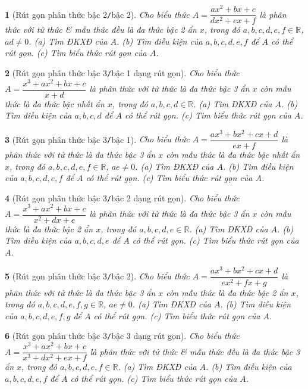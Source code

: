 \documentclass{article}
\newtheorem{baitoan}{}
\begin{document}
\begin{baitoan}[Rút gọn phân thức bậc 2{\tt/}bậc 2]
	Cho biểu thức $A = \dfrac{ax^2 + bx + c}{dx^2 + ex + f}$ là phân thức với tử thức \& mẫu thức đều là đa thức bậc 2 ẩn $x$, trong đó $a,b,c,d,e,f\in\mathbb{R}$, $ad\ne0$. (a) Tìm {\rm ĐKXĐ} của $A$. (b) Tìm điều kiện của $a,b,c,d,e,f$ để $A$ có thể rút gọn. (c) Tìm biểu thức rút gọn của $A$.
\end{baitoan}

\begin{baitoan}[Rút gọn phân thức bậc 3{\tt/}bậc 1 dạng rút gọn]
	Cho biểu thức $A = \dfrac{x^3 + ax^2 + bx + c}{x + d}$ là phân thức với tử thức là đa thức bậc 3 ẩn $x$ còn mẫu thức là đa thức bậc nhất ẩn $x$, trong đó $a,b,c,d\in\mathbb{R}$. (a) Tìm {\rm ĐKXĐ} của $A$. (b) Tìm điều kiện của $a,b,c,d$ để $A$ có thể rút gọn. (c) Tìm biểu thức rút gọn của $A$.
\end{baitoan}

\begin{baitoan}[Rút gọn phân thức bậc 3{\tt/}bậc 1]
	Cho biểu thức $A = \dfrac{ax^3 + bx^2 + cx + d}{ex + f}$ là phân thức với tử thức là đa thức bậc 3 ẩn $x$ còn mẫu thức là đa thức bậc nhất ẩn $x$, trong đó $a,b,c,d,e,f\in\mathbb{R}$, $ae\ne0$. (a) Tìm {\rm ĐKXĐ} của $A$. (b) Tìm điều kiện của $a,b,c,d,e,f$ để $A$ có thể rút gọn. (c) Tìm biểu thức rút gọn của $A$.
\end{baitoan}

\begin{baitoan}[Rút gọn phân thức bậc 3{\tt/}bậc 2 dạng rút gọn]
	Cho biểu thức $A = \dfrac{x^3 + ax^2 + bx + c}{x^2 + dx + e}$ là phân thức với tử thức là đa thức bậc 3 ẩn $x$ còn mẫu thức là đa thức bậc 2 ẩn $x$, trong đó $a,b,c,d,e\in\mathbb{R}$. (a) Tìm {\rm ĐKXĐ} của $A$. (b) Tìm điều kiện của $a,b,c,d,e$ để $A$ có thể rút gọn. (c) Tìm biểu thức rút gọn của $A$.
\end{baitoan}

\begin{baitoan}[Rút gọn phân thức bậc 3{\tt/}bậc 2]
	Cho biểu thức $A = \dfrac{ax^3 + bx^2 + cx + d}{ex^2 + fx + g}$ là phân thức với tử thức là đa thức bậc 3 ẩn $x$ còn mẫu thức là đa thức bậc 2 ẩn $x$, trong đó $a,b,c,d,e,f,g\in\mathbb{R}$, $ae\ne0$. (a) Tìm {\rm ĐKXĐ} của $A$. (b) Tìm điều kiện của $a,b,c,d,e,f,g$ để $A$ có thể rút gọn. (c) Tìm biểu thức rút gọn của $A$.
\end{baitoan}

\begin{baitoan}[Rút gọn phân thức bậc 3{\tt/}bậc 3 dạng rút gọn]
	Cho biểu thức $A = \dfrac{x^3 + ax^2 + bx + c}{x^3 + dx^2 + ex + f}$ là phân thức với tử thức \& mẫu thức đều là đa thức bậc 3 ẩn $x$, trong đó $a,b,c,d,e,f\in\mathbb{R}$. (a) Tìm {\rm ĐKXĐ} của $A$. (b) Tìm điều kiện của $a,b,c,d,e,f$ để $A$ có thể rút gọn. (c) Tìm biểu thức rút gọn của $A$.
\end{baitoan}
\end{document}
